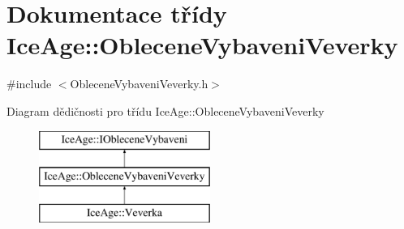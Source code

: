 \hypertarget{classIceAge_1_1ObleceneVybaveniVeverky}{}\section{Dokumentace třídy Ice\+Age\+:\+:Oblecene\+Vybaveni\+Veverky}
\label{classIceAge_1_1ObleceneVybaveniVeverky}


{\ttfamily \#include $<$Oblecene\+Vybaveni\+Veverky.\+h$>$}

Diagram dědičnosti pro třídu Ice\+Age\+:\+:Oblecene\+Vybaveni\+Veverky\begin{figure}[H]
\begin{center}
\leavevmode
\includegraphics[height=3.000000cm]{d4/d90/classIceAge_1_1ObleceneVybaveniVeverky}
\end{center}
\end{figure}
